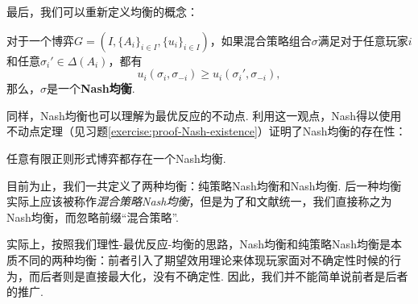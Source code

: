 最后，我们可以重新定义均衡的概念：

\begin{definition}[Nash均衡]
对于一个博弈$G=(I,\{A_i\}_{i\in I},\{u_i\}_{i\in I})$，如果混合策略组合$\sigma$满足对于任意玩家$i$和任意$\sigma_i'\in \Delta(A_i)$，都有
\[u_i(\sigma_i,\sigma_{-i})\geq u_i(\sigma_i',\sigma_{-i}),\]
那么，$\sigma$是一个\textbf{Nash均衡}.
\end{definition}

同样，Nash均衡也可以理解为最优反应的不动点. 利用这一观点，Nash得以使用不动点定理（见习题\ref{exercise:proof-Nash-existence}）证明了Nash均衡的存在性：
\begin{theorem}\label{thm:Nash-existence}
任意有限正则形式博弈都存在一个Nash均衡.
\end{theorem}

\begin{remark}
    目前为止，我们一共定义了两种均衡：纯策略Nash均衡和Nash均衡. 后一种均衡实际上应该被称作\textit{混合策略Nash均衡}，但是为了和文献统一，我们直接称之为Nash均衡，而忽略前缀“混合策略”.

    实际上，按照我们理性-最优反应-均衡的思路，Nash均衡和纯策略Nash均衡是本质不同的两种均衡：前者引入了期望效用理论来体现玩家面对不确定性时候的行为，而后者则是直接最大化，没有不确定性. 因此，我们并不能简单说前者是后者的推广. 
\end{remark}

